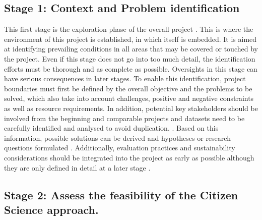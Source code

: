 \subsection{Stage 1: Context and Problem identification}
This first stage is the exploration phase of the overall project \autocite{citizenscience.govBasicStepsYour}. This is where the environment of this project is established, in which itself is embedded. It is aimed at identifying prevailing conditions in all areas that may be covered or touched by the project. Even if this stage does not go into too much detail, the identification efforts must be thorough and as complete as possible. Oversights in this stage can have serious consequences in later stages. To enable this identification, project boundaries must first be defined by the overall objective and the problems to be solved, which also take into account challenges, positive and negative constraints as well as resource requirements. In addition, potential key stakeholders should be involved from the beginning and comparable projects and datasets need to be carefully identified and analysed to avoid duplication. \autocite{citizenscience.govBasicStepsYour,fraislCitizenScienceEnvironmental2022,minkmanCitizenScienceWater2015}. Based on this information, possible solutions can be derived and hypotheses or research questions formulated \autocite{fraislCitizenScienceEnvironmental2022, silvertownNewDawnCitizen2009}. Additionally, evaluation practices and sustainability considerations should be integrated into the project as early as possible although they are only defined in detail at a later stage \autocite{fraislCitizenScienceEnvironmental2022}.

\subsection{Stage 2: Assess the feasibility of the Citizen Science approach.}

